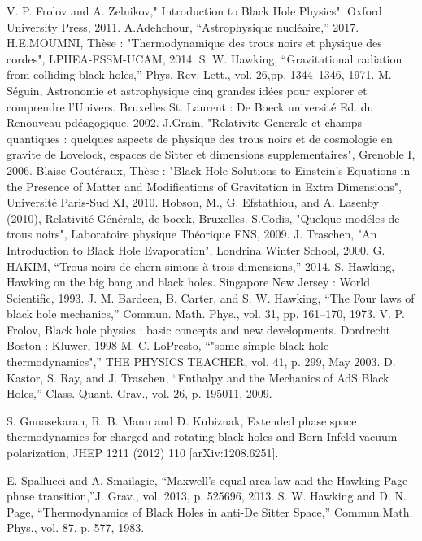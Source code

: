 \documentclass[12pt,  a4paper, openright]{report} %
\begin{document}
\begin{thebibliography}{99}
  V. P. Frolov and A. Zelnikov," Introduction to Black Hole Physics". Oxford University Press, 2011.
  A.Adehchour, “Astrophysique nucléaire,” 2017.
  H.E.MOUMNI, Thèse : "Thermodynamique des trous noirs et physique des
cordes", LPHEA-FSSM-UCAM, 2014.
  S. W. Hawking, “Gravitational radiation from colliding black holes,” Phys. Rev. Lett., vol. 26,pp. 1344–1346, 1971.
 M. Séguin, Astronomie et astrophysique cinq grandes idées pour explorer et comprendre l’Univers. Bruxelles St. Laurent : De Boeck université Ed. du Renouveau pdéagogique, 2002.
 J.Grain, "Relativite Generale et champs quantiques : quelques aspects de physique
des trous noirs et de cosmologie en gravite de Lovelock, espaces de Sitter et
dimensions supplementaires", Grenoble I, 2006.
 Blaise Goutéraux, Thèse : "Black-Hole Solutions to Einstein’s Equations in the
 Presence of Matter and Modifications of Gravitation in Extra Dimensions", Université Paris-Sud XI, 2010.
  Hobson, M., G. Efstathiou, and A. Lasenby (2010), Relativité Générale, de boeck,
Bruxelles.
  S.Codis, "Quelque modéles de trous noirs", Laboratoire physique Théorique ENS,
2009.
  J. Traschen, "An Introduction to Black Hole Evaporation", Londrina Winter
School, 2000.
  G. HAKIM, “Trous noirs de chern-simons à trois dimensions,” 2014.
  S. Hawking, Hawking on the big bang and black holes. Singapore New Jersey : World Scientific, 1993.
 J. M. Bardeen, B. Carter, and S. W. Hawking, “The Four laws of black hole mechanics,” Commun. Math. Phys., vol. 31, pp. 161–170, 1973.
 V. P. Frolov, Black hole physics : basic concepts and new developments. Dordrecht Boston : Kluwer,
1998
  M. C. LoPresto, “"some simple black hole thermodynamics",” THE PHYSICS TEACHER, vol. 41,
p. 299, May 2003.
  D. Kastor, S. Ray, and J. Traschen, “Enthalpy and the Mechanics of AdS Black Holes,” Class. Quant.
Grav., vol. 26, p. 195011, 2009.

 S. Gunasekaran, R. B. Mann and D. Kubiznak, Extended phase space thermodynamics for charged and
rotating black holes and Born-Infeld vacuum polarization, JHEP 1211 (2012) 110 [arXiv:1208.6251].

 E. Spallucci and A. Smailagic, “Maxwell’s equal area law and the Hawking-Page phase transition,”J. Grav., vol. 2013, p. 525696, 2013.
  S. W. Hawking and D. N. Page, “Thermodynamics of Black Holes in anti-De Sitter Space,” Commun.Math. Phys., vol. 87, p. 577, 1983.


\end{thebibliography}
\end{document}
